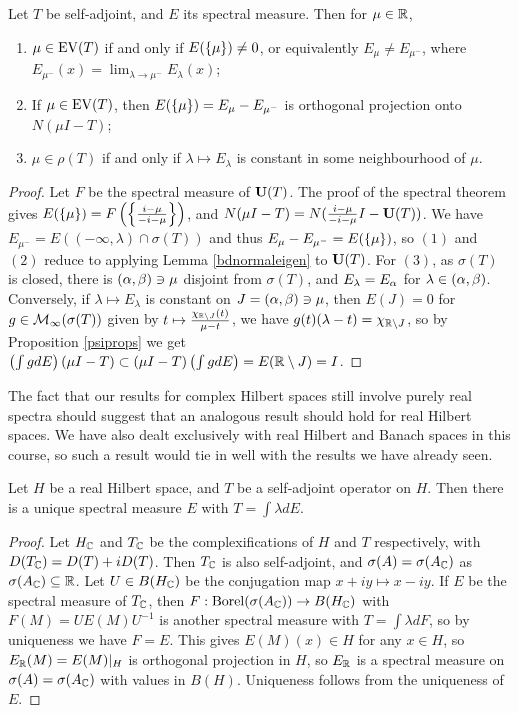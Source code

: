 \documentclass[10pt]{amsart}
\begin{document}
\begin{theorem}\label{eigenvaldecomp}
    Let $T$ be self-adjoint, and $E$ its spectral measure. Then for $\mu \in \mathbb{R}$,
    \begin{enumerate}
        \item $\mu \in \operatorname{EV}(T)$ if and only if $E(\left\{  \mu  \right\}) \neq 0$, or equivalently $E_\mu \neq E_{\mu^-}$, where $E_{\mu^-}(x) = \lim_{\lambda \to \mu^-}E_\lambda(x)$;
        \item If $\mu \in \operatorname{EV}(T)$, then $E(\left\{  \mu  \right\}) = E_\mu - E_{\mu^-}$ is orthogonal projection onto $N(\mu I - T)$;
        \item $\mu \in \rho(T)$ if and only if $\lambda \mapsto E_\lambda$ is constant in some neighbourhood of $\mu$.
    \end{enumerate}
\end{theorem}
\begin{proof}
    Let $F$ be the spectral measure of $\mathbf{U}(T)$. The proof of the spectral theorem gives $E(\left\{  \mu  \right\}) = F\left(  \left\{  \frac{i - \mu}{-i - \mu}  \right\}  \right)$, and $N(\mu I - T) = N(\frac{i - \mu}{-i - \mu}I - \mathbf{U}(T))$. We have $E_{\mu^-} = E((-\infty, \lambda) \cap \sigma(T))$ and thus $E_{\mu} - E_{\mu^-} = E(\left\{  \mu  \right\})$, so $(1)$ and $(2)$ reduce to applying Lemma \ref{bdnormaleigen} to $\mathbf{U}(T)$. For $(3)$, as $\sigma(T)$ is closed, there is $(\alpha, \beta) \ni \mu$ disjoint from $\sigma(T)$, and $E_\lambda = E_\alpha$ for $\lambda \in (\alpha, \beta)$. Conversely, if $\lambda \mapsto E_\lambda$ is constant on $J = (\alpha, \beta) \ni \mu$, then $E(J) = 0$ for $g \in \mathcal{M}_\infty(\sigma(T))$ given by $t \mapsto \frac{\chi_{\mathbb{R} \setminus J}(t)}{\mu - t}$, we have $g(t)(\lambda - t) = \chi_{\mathbb{R} \setminus J}$, so by Proposition \ref{psiprops} we get $\left(  \int g dE  \right)(\mu I - T) \subset (\mu I - T)\left(  \int g dE  \right) = E(\mathbb{R} \setminus J) = I$.
\end{proof}
The fact that our results for complex Hilbert spaces still involve purely real spectra should suggest that an analogous result should hold for real Hilbert spaces. We have also dealt exclusively with real Hilbert and Banach spaces in this course, so such a result would tie in well with the results we have already seen.
\begin{theorem}
    Let $H$ be a real Hilbert space, and $T$ be a self-adjoint operator on $H$. Then there is a unique spectral measure $E$ with $T = \int \lambda dE$.
\end{theorem}
\begin{proof}
    Let $H_{\mathbb{C}}$ and $T_{\mathbb{C}}$ be the complexifications of $H$ and $T$ respectively, with $D(T_{\mathbb{C}}) = D(T) + iD(T)$. Then $T_{\mathbb{C}}$ is also self-adjoint, and $\sigma(A) = \sigma(A_{\mathbb{C}})$ as $\sigma(A_{\mathbb{C}}) \subseteq \mathbb{R}$. Let $U \in B(H_{\mathbb{C}})$ be the conjugation map $x + iy \mapsto x - iy$. If $E$ be the spectral measure of $T_{\mathbb{C}}$, then $F : \operatorname{Borel}(\sigma(A_{\mathbb{C}})) \to B(H_{\mathbb{C}})$ with $F(M) = UE(M)U^{-1}$ is another spectral measure with $T = \int \lambda dF$, so by uniqueness we have $F = E$. This gives $E(M)(x) \in H$ for any $x \in H$, so $E_{\mathbb{R}}(M) = E(M)|_H$ is orthogonal projection in $H$, so $E_{\mathbb{R}}$ is a spectral measure on $\sigma(A) = \sigma(A_{\mathbb{C}})$ with values in $B(H)$. Uniqueness follows from the uniqueness of $E$.
\end{proof} %
\end{document}
